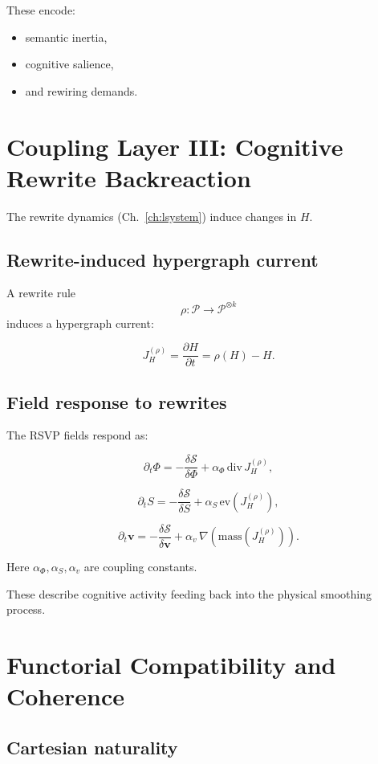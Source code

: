These encode:

\begin{itemize}
  \item semantic inertia,
  \item cognitive salience,
  \item and rewiring demands.
\end{itemize}


\section{Coupling Layer III: Cognitive Rewrite Backreaction}

The rewrite dynamics (Ch.~\ref{ch:lsystem}) induce changes in $H$.

\subsection{Rewrite-induced hypergraph current}

A rewrite rule
\[
\rho : \mathscr{P} \to \mathscr{P}^{\otimes k}
\]
induces a hypergraph current:

\[
J^{(\rho)}_{H}
=
\frac{\partial H}{\partial t}
=
\rho(H) - H.
\]

\subsection{Field response to rewrites}

The RSVP fields respond as:

\[
\partial_t \Phi
=
-\frac{\delta\mathcal{S}}{\delta \Phi}
+
\alpha_\Phi\, \mathrm{div}\,J_H^{(\rho)},
\]

\[
\partial_t S
=
-\frac{\delta\mathcal{S}}{\delta S}
+
\alpha_S\, \mathrm{ev}(J_H^{(\rho)}),
\]

\[
\partial_t \mathbf{v}
=
-\frac{\delta\mathcal{S}}{\delta \mathbf{v}}
+
\alpha_v\, \nabla(\mathrm{mass}(J_H^{(\rho)})).
\]

Here $\alpha_\Phi,\alpha_S,\alpha_v$ are coupling constants.

These describe cognitive activity feeding back into the physical smoothing process.


\section{Functorial Compatibility and Coherence}

\subsection{Cartesian naturality}

